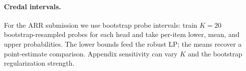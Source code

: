 \paragraph{Credal intervals.}
For the ARR submission we use bootstrap probe intervals: train $K=20$
bootstrap-resampled probes for each head and take per-item lower, mean, and
upper probabilities. The lower bounds feed the robust LP; the means recover a
point-estimate comparison. Appendix sensitivity can vary $K$ and the bootstrap
regularization strength.

